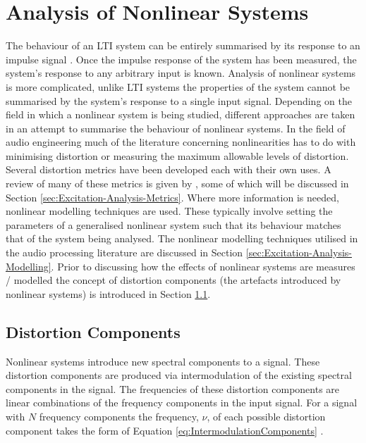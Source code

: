 \section{Analysis of Nonlinear Systems}
\label{sec:Excitation-AnalysisOfNonlinearSystems}
	The behaviour of an LTI system can be entirely summarised by its response to an impulse signal
	\citep{phillips2007signals}. Once the impulse response of the system has been measured, the system's response to any
	arbitrary input is known. Analysis of nonlinear systems is more complicated, unlike LTI systems the properties of
	the system cannot be summarised by the system's response to a single input signal. Depending on the field in which a
	nonlinear system is being studied, different approaches are taken in an attempt to summarise the behaviour of
	nonlinear systems. In the field of audio engineering much of the literature concerning nonlinearities has to do with
	minimising distortion or measuring the maximum allowable levels of distortion. Several distortion metrics have been
	developed each with their own uses. A review of many of these metrics is given by \citet{voishvillo2006assessment},
	some of which will be discussed in Section \ref{sec:Excitation-Analysis-Metrics}. Where more information is needed,
	nonlinear modelling techniques are used. These typically involve setting the parameters of a generalised nonlinear
	system such that its behaviour matches that of the system being analysed. The nonlinear modelling techniques
	utilised in the audio processing literature are discussed in Section \ref{sec:Excitation-Analysis-Modelling}. Prior
	to discussing how the effects of nonlinear systems are measures / modelled the concept of distortion components (the
	artefacts introduced by nonlinear systems) is introduced in Section \ref{sec:Excitation-Analysis-Components}.

	\subsection{Distortion Components}
	\label{sec:Excitation-Analysis-Components}
		Nonlinear systems introduce new spectral components to a signal. These distortion components are produced
		via intermodulation of the existing spectral components in the signal. The frequencies of these distortion
		components are linear combinations of the frequency components in the input signal. For a signal with $N$
		frequency components the frequency, $\nu$, of each possible distortion component takes the form of Equation
		\ref{eq:IntermodulationComponents} \citep{hulick2005solid}.

